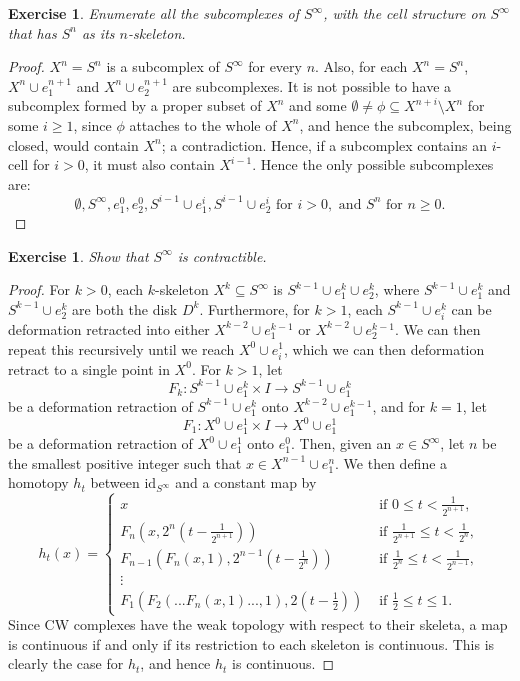 \documentclass{article}
\newtheorem{exercise}[theorem]{Exercise}
\begin{document}
\begin{exercise}
Enumerate all the subcomplexes of $S^\infty$, with the cell structure on $S^\infty$ that has $S^n$ as its $n$-skeleton.
\end{exercise}
\begin{proof}
$X^n=S^n$ is a subcomplex of $S^\infty$ for every $n$. Also, for each $X^n=S^n$, $X^n\cup e_{1}^{n+1}$ and $X^n\cup e_{2}^{n+1}$ are subcomplexes. It is not possible to have a subcomplex formed by a proper subset of $X^n$ and some $\emptyset\neq\phi\subseteq X^{n+i}\setminus X^n$ for some $i\geq 1$, since $\phi$ attaches to the whole of $X^n$, and hence the subcomplex, being closed, would contain $X^n$; a contradiction. Hence, if a subcomplex contains an $i$-cell for $i>0$, it must also contain $X^{i-1}$. Hence the only possible subcomplexes are:
\[\emptyset, S^\infty, e_1^0,e_2^0, S^{i-1}\cup e_1^i,S^{i-1}\cup e_2^i \text{ for } i>0,\text{ and } S^n\text{ for }n\geq 0.\]
\end{proof}

\begin{exercise}
Show that $S^\infty$ is contractible.
\end{exercise}
\begin{proof}
For $k>0$, each $k$-skeleton $X^k\subseteq S^\infty$ is $S^{k-1}\cup e_1^k\cup e_2^k$, where $S^{k-1}\cup e_1^k$ and $S^{k-1}\cup e_2^k$ are both the disk $D^k$. Furthermore, for $k>1$, each $S^{k-1}\cup e_i^k$ can be deformation retracted into either $X^{k-2}\cup e_1^{k-1}$ or $X^{k-2}\cup e_2^{k-1}$. We can then repeat this recursively until we reach $X^0\cup e_i^{1}$, which we can then deformation retract to a single point in $X^0$. For $k>1$, let \[F_k:S^{k-1}\cup e_1^k\times I\to S^{k-1}\cup e_1^k\] be a deformation retraction of $S^{k-1}\cup e_1^k$ onto $X^{k-2}\cup e_1^{k-1}$, and for $k=1$, let \[F_1:X^0\cup e_1^1\times I\to X^0\cup e_1^1\] be a deformation retraction of $X^0\cup e_1^1$ onto $e_1^0$. Then, given an $x\in S^\infty$, let $n$ be the smallest positive integer such that $x\in X^{n-1}\cup e_1^n$. We then define a homotopy $h_t$ between $\text{id}_{S^\infty}$ and a constant map by\[h_t(x)=\begin{cases}
    x&\text{ if }0\leq t<\frac{1}{2^{n+1}},\\F_n(x,2^n(t-\frac{1}{2^{n+1}}))&\text{ if }\frac{1}{2^{n+1}}\leq t<\frac{1}{2^n},\\F_{n-1}(F_n(x,1),2^{n-1}(t-\frac{1}{2^{n}}))&\text{ if }\frac{1}{2^n}\leq t<\frac{1}{2^{n-1}},\\\vdots\\F_1(F_2(...F_n(x,1)...,1),2(t-\frac{1}{2}))&\text{ if }\frac{1}{2}\leq t\leq 1.
\end{cases}\]Since CW complexes have the weak topology with respect to their skeleta, a map is continuous if and only if its restriction to each skeleton is continuous. This is clearly the case for $h_t$, and hence $h_t$ is continuous.
\end{proof}
\end{document}
